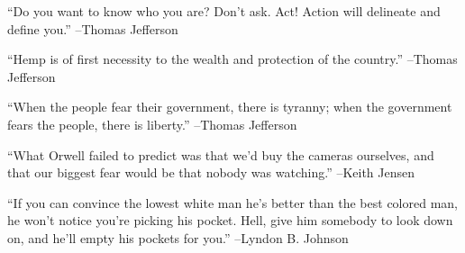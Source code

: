 \documentclass{article}%
\begin{document}
\linebreak%
\vspace{1mm}%
\begin{minipage}{\textwidth}%
\flushleft%
“Do you want to know who you are? Don't ask. Act! Action will delineate and define you.”%
\linebreak%
\vspace{1mm}%
–Thomas Jefferson%
\linebreak%
\vspace{1mm}%
\end{minipage}%
\linebreak%
\vspace{1mm}%
\begin{minipage}{\textwidth}%
\flushleft%
“Hemp is of first necessity to the wealth and protection of the country.”%
\linebreak%
\vspace{1mm}%
–Thomas Jefferson%
\linebreak%
\vspace{1mm}%
\end{minipage}%
\linebreak%
\vspace{1mm}%
\begin{minipage}{\textwidth}%
\flushleft%
“When the people fear their government, there is tyranny; when the government fears the people, there is liberty.”%
\linebreak%
\vspace{1mm}%
–Thomas Jefferson%
\linebreak%
\vspace{1mm}%
\end{minipage}%
\linebreak%
\vspace{1mm}%
\begin{minipage}{\textwidth}%
\flushleft%
“What Orwell failed to predict was that we'd buy the cameras ourselves, and that our biggest fear would be that nobody was watching.”%
\linebreak%
\vspace{1mm}%
–Keith Jensen%
\linebreak%
\vspace{1mm}%
\end{minipage}%
\linebreak%
\vspace{1mm}%
\begin{minipage}{\textwidth}%
\flushleft%
“If you can convince the lowest white man he's better than the best colored man, he won't notice you're picking his pocket. Hell, give him somebody to look down on, and he'll empty his pockets for you.”%
\linebreak%
\vspace{1mm}%
–Lyndon B. Johnson%
\linebreak%
\vspace{1mm}%
\end{minipage}%
\end{document}

